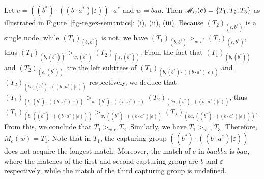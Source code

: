 \begin{example}\label{exmp-regex-semantics}
Let $e = ((b^\ast) \cdot ((b \cdot a^\ast) | \varepsilon)) \cdot a^\ast$ and $w= baa$. Then $\mathscr{M}_{w}(e) = \{T_1,T_2,T_3\}$ as illustrated in Figure~\ref{fig-regex-semantics}: (i), (ii), (iii).  Because  $(T_2)_{(\varepsilon, b^\ast)}$ is a single node, while $(T_1)_{(b,b^\ast)}$ is not, we have $(T_1)_{(b,b^\ast)} >_{w, b^\ast} (T_2)_{(\varepsilon, b^\ast)}$, thus $(T_1)_{(b, (b^\ast))} >_{w, (b^\ast)} (T_2)_{(\varepsilon, (b^\ast))}$. From the fact that $(T_1)_{(b, (b^\ast))}$ and $(T_2)_{(\varepsilon, (b^\ast))}$ are the left subtrees of $(T_1)_{(b, (b^\ast) \cdot ((b\cdot a^\ast) | \varepsilon))}$ and $ (T_2)_{(ba, (b^\ast) \cdot ((b\cdot a^\ast) | \varepsilon))}$ respectively, we deduce that $(T_1)_{(b, (b^\ast) \cdot ((b\cdot a^\ast) | \varepsilon))} >_{w, (b^\ast) \cdot ((b\cdot a^\ast) | \varepsilon)} (T_2)_{(ba, (b^\ast) \cdot ((b\cdot a^\ast) | \varepsilon))}$, thus $(T_1)_{(b, ((b^\ast) \cdot ((b\cdot a^\ast) | \varepsilon)))} >_{w, ((b^\ast) \cdot ((b\cdot a^\ast) | \varepsilon))} (T_2)_{(ba, ((b^\ast) \cdot ((b\cdot a^\ast) | \varepsilon)))}$. From this, we conclude that $T_1 >_{w, e} T_2$. Similarly, we have $T_1 >_{w, e} T_3$. Therefore, $M_e(w) = T_1$. 
Note that in $T_1$, the capturing group $((b^\ast) \cdot ((b\cdot a^\ast) | \varepsilon))$ does not acquire the longest match. Moreover, the match of $e$ in $baabba$ is $baa$, where the matches of the first and second capturing group are $b$ and $\varepsilon$ respectively, while the match of the third capturing group is undefined.
\begin{figure}[ht]
\centering

\end{figure}
\end{example}
